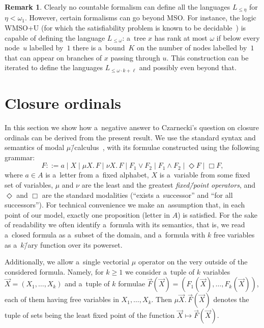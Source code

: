 \documentclass[11pt,a4paper]{amsart}
\theoremstyle{plain}
\theoremstyle{definition}
\newtheorem{rem}[thm]{Remark}
\theoremstyle{defC}
\theoremstyle{thmC}
\theoremstyle{plain}
\numberwithin{equation}{section}
\numberwithin{equation}{section}
\numberwithin{figure}{section}
\begin{document}
\begin{rem}\label{rem:wmsou}
	Clearly no countable formalism can define all the languages $L_{\leq\eta}$ for $\eta<\omega_1$.
	However, certain formalisms can go beyond MSO.
	For instance, the logic WMSO+U (for which the satisfiability problem is known to be decidable~\cite{bojanczyk_wmso_u_p}) is capable of defining the language $L_{\leq \omega}$:
	a~tree $x$ has rank at most $\omega$ if below every node~$u$ labelled by~$1$ there is a~bound~$K$ on the number of nodes labelled by~$1$ that can appear on branches of $x$ passing through $u$.
	This construction can be iterated to define the languages $L_{\leq \omega\cdot k+\ell}$ and possibly even beyond that.
\end{rem}



\section{Closure ordinals}
\label{sec:closure_ordinals}

In this section we show how a~negative answer to Czarnecki's question on closure ordinals can be derived from the present result.
We use the standard syntax and semantics of modal $\mu$\=/calculus~\cite{kozen-mu-calc,niwinski_rudiments,Demri2016,julian-igor-handook}, with its formulae constructed using the following grammar:
\[F ::= a \mid X \mid \mu X.\, F \mid \nu X.\, F \mid F_1\lor F_2 \mid F_1\land F_2 \mid \Diamond F \mid \Box F,\]
where $a\in A$ is a~letter from a~fixed alphabet, $X$ is a~variable from some fixed set of variables,
$\mu$ and $\nu$ are the least and the greatest \emph{fixed\=/point operators}, and $\Diamond$ and $\Box$ are the standard modalities (``exists a~successor'' and ``for all successors'').
For technical convenience we make an~assumption that, in each point of our model, exactly one proposition (letter in $A$) is satisfied.
For the sake of readability we often identify a~formula with its semantics, that is, we read a~closed formula as a~subset of the domain,
and a~formula with $k$ free variables as a~$k$\=/ary function over its powerset.

Additionally, we allow a~single vectorial $\mu$ operator on the very outside of the considered formula.
Namely, for $k\geq 1$ we consider a~tuple of $k$ variables $\vec{X}=(X_1,\dots,X_k)$ and a~tuple of $k$ formulae $\vec{F}(\vec{X})=(F_1(\vec{X}),\dots,F_k(\vec{X}))$,
each of them having free variables in $X_1,\dots,X_k$.
Then $\mu\vec{X}.\,\vec{F}(\vec{X})$ denotes the tuple of sets being the least fixed point of the function $\vec{X}\mapsto\vec{F}(\vec{X})$.
\end{document}
